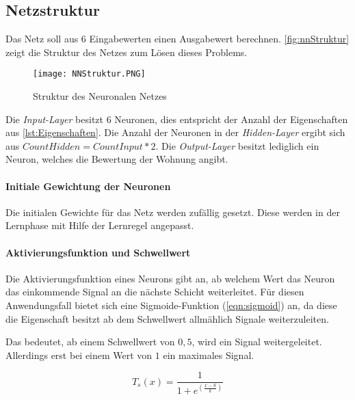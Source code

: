 \subsection{Netzstruktur}
Das Netz soll aus $6$ Eingabewerten einen Ausgabewert berechnen.
\autoref{fig:nnStruktur} zeigt die Struktur des Netzes zum Lösen
dieses Problems.
\begin{figure}[ht]
    \centering
    \texttt{[image: NNStruktur.PNG]}
    \caption{Struktur des Neuronalen Netzes}
    \label{fig:nnStruktur}
\end{figure}

Die \textit{Input-Layer} besitzt $6$ Neuronen, dies entspricht der
Anzahl der Eigenschaften aus \autoref{lst:Eigenschaften}.
Die Anzahl der Neuronen in der \textit{Hidden-Layer} ergibt sich aus
$CountHidden = CountInput * 2$. Die \textit{Output-Layer} besitzt
lediglich ein Neuron, welches die Bewertung der Wohnung angibt.

\paragraph{Initiale Gewichtung der Neuronen}
Die initialen Gewichte für das Netz werden zufällig gesetzt. Diese werden in der Lernphase
mit Hilfe der Lernregel angepasst.

\paragraph{Aktivierungsfunktion und Schwellwert}
Die Aktivierungsfunktion eines Neurons gibt an, ab welchem Wert das Neuron das
einkommende Signal an die nächste Schicht weiterleitet.
Für diesen Anwendungsfall bietet sich eine Sigmoide-Funktion (\autoref{eqn:sigmoid}) an,
da diese die Eigenschaft besitzt ab dem Schwellwert allmählich
Signale weiterzuleiten.

Das bedeutet, ab einem Schwellwert von $0,5$, wird ein Signal weitergeleitet.
Allerdings erst bei einem Wert von $1$ ein maximales Signal.

\begin{equation}
    T_s(x) = \frac{1}{1+e^(\frac{x-S}{k})}
    \label{eqn:sigmoid}
\end{equation}

